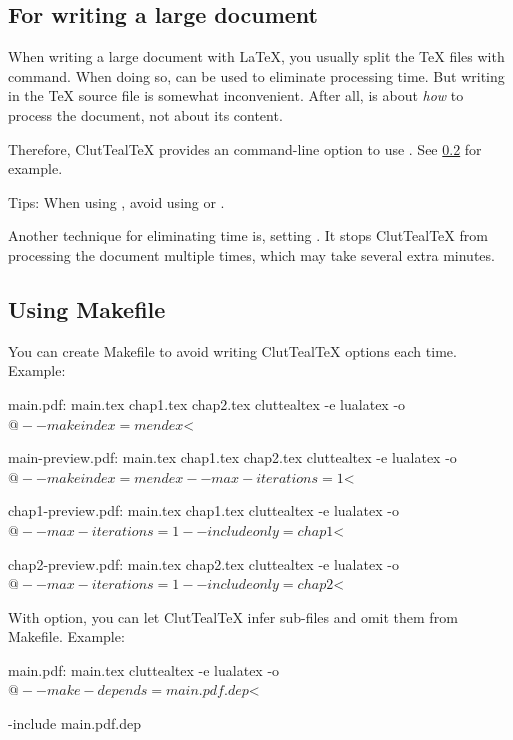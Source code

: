 \documentclass[a4paper, 11pt]{scrartcl}
\let\TeXold\TeX
\newcommand\CluttealTeX{ClutTeal\TeX\xspace}
\renewcommand\TeX{\TeXold\xspace}
\begin{document}
\subsection{For writing a large document}
When writing a large document with \LaTeX, you usually split the \TeX files with  command.
When doing so,  can be used to eliminate processing time.
But writing  in the \TeX source file is somewhat inconvenient.
After all,  is about \emph{how} to process the document, not about its content.

Therefore, \CluttealTeX provides an command-line option to use .
See \cref{sec:makefile-example} for example.

Tips: When using , avoid using  or .

Another technique for eliminating time is, setting .
It stops \CluttealTeX from processing the document multiple times, which may take several extra minutes.

\subsection{Using Makefile}\label{sec:makefile-example}
You can create Makefile to avoid writing \CluttealTeX options each time.
Example:
\begin{boxcode}[make]
main.pdf: main.tex chap1.tex chap2.tex
    cluttealtex -e lualatex -o $@ --makeindex=mendex $<

main-preview.pdf: main.tex chap1.tex chap2.tex
    cluttealtex -e lualatex -o $@ --makeindex=mendex --max-iterations=1 $<

chap1-preview.pdf: main.tex chap1.tex
    cluttealtex -e lualatex -o $@ --max-iterations=1 --includeonly=chap1 $<

chap2-preview.pdf: main.tex chap2.tex
    cluttealtex -e lualatex -o $@ --max-iterations=1 --includeonly=chap2 $<
\end{boxcode}

With  option, you can let \CluttealTeX infer sub-files and omit them from Makefile.
Example:

\begin{boxcode}[make]
main.pdf: main.tex
    cluttealtex -e lualatex -o $@ --make-depends=main.pdf.dep $<

-include main.pdf.dep
\end{boxcode}
\end{document}

